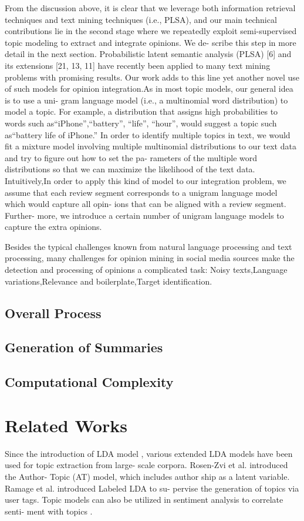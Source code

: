 \documentclass[runningheads,a4paper]{llncs}
\begin{document}
From the discussion above, it is clear that we leverage both
information retrieval techniques and text mining techniques (i.e., PLSA), and our main technical contributions lie in the second stage where we repeatedly exploit semi-supervised topic modeling to extract and integrate opinions. We de- scribe this step in more detail in the next section.
Probabilistic latent semantic analysis (PLSA) [6] and its
extensions [21, 13, 11] have recently been applied to many text mining problems with promising results. Our work adds to this line yet another novel use of such models for opinion integration.As in most topic models, our general idea is to use a uni-
gram language model (i.e., a multinomial word distribution) to model a topic. For example, a distribution that assigns high probabilities to words such as“iPhone”,“battery”, “life”, “hour”, would suggest a topic such as“battery life of iPhone.” In order to identify multiple topics in text, we would fit a mixture model involving multiple multinomial distributions to our text data and try to figure out how to set the pa- rameters of the multiple word distributions so that we can maximize the likelihood of the text data. Intuitively,In order to apply this kind of model to our integration
problem, we assume that each review segment corresponds to a unigram language model which would capture all opin- ions that can be aligned with a review segment. Further- more, we introduce a certain number of unigram language models to capture the extra opinions.

Besides the typical challenges known from natural language processing and text processing, many challenges for opinion mining in social media sources make the detection and processing of opinions a complicated task: Noisy texts,Language variations,Relevance and boilerplate,Target identification.\cite{}
\subsection{Overall Process}

\subsection{Generation of Summaries}

\subsection{Computational Complexity}

\section{Related Works}
Since the introduction of LDA model \cite{blei2003latent}, various extended LDA models have been used for topic extraction from large- scale corpora. Rosen-Zvi et al. \cite{rosen2004author} introduced the Author- Topic (AT) model, which includes author ship as a latent variable. Ramage et al. \cite{ramage2009labeled} introduced Labeled LDA to su- pervise the generation of topics via user tags. Topic models can also be utilized in sentiment analysis to correlate senti- ment with topics \cite{mei2007topic}.
\end{document}
